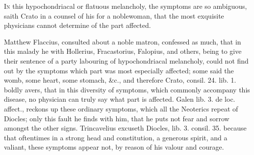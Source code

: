 {\lettrine{I}{n} this hypochondriacal or flatuous melancholy, the symptoms are so
ambiguous, saith Crato in a counsel of his for a noblewoman, that
the most exquisite physicians cannot determine of the part affected.

Matthew Flaccius, consulted about a noble matron, confessed as much,
that in this malady he with Hollerius, Fracastorius, Falopius, and
others, being to give their sentence of a party labouring of
hypochondriacal melancholy, could not find out by the symptoms which
part was most especially affected; some said the womb, some heart, some
stomach, \&c., and therefore Crato, consil. 24. lib. 1. boldly avers,
that in this diversity of symptoms, which commonly accompany this
disease, no physician can truly say what part is affected. Galen
lib. 3. de loc. affect., reckons up these ordinary symptoms, which all
the Neoterics repeat of Diocles; only this fault he finds with him,
that he puts not fear and sorrow amongst the other signs. Trincavelius
excuseth Diocles, lib. 3. consil. 35. because that oftentimes in a
strong head and constitution, a generous spirit, and a valiant, these
symptoms appear not, by reason of his valour and courage.

}
